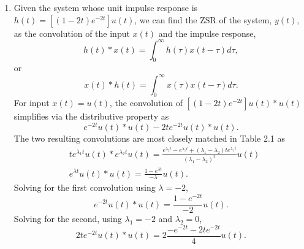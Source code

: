 \documentclass{article}
\begin{document}
\begin{enumerate}[label=\thesubsubsection]
		Using the simplified impulse matching method to confirm the results, 
		\begin{align}
			h(t) = b_0\delta(t) + [P(D)y_n(t)]u(t),
		\end{align}
		assume \(b_0 = 0\), \(P(D) = D+5\) and solve for \(y_n(t)\), assuming \(y_n(0) = 0\) and \(\dot{y}_n(0) = 1\) as 
		\begin{align*}
			&h(t) = (c_1e^{-3t} + c_2e^{-t})u(t) \\
			&\dot{h}(t) = (-3c_1e^{-3t} - c_2e^{-t})u(t) \\ \\
			&h(0) = c_1 + c_2 = 0 \\
			&\dot{h}(0) = -3c_1 - c_2 = 1 \\ \\
			&c_1 = -0.5, \ \ c_2 = 0.5 \\ \\
			&y_n(t) = -0.5e^{-3t} + 0.5e^{-t}.
		\end{align*}
		Solving for \(h(t),\)
		\[
			h(t) = [(D+5)(-0.5e^{-3t} + 0.5e^{-t})]u(t) = [(1.5e^{-3t} - 0.5e^{-t}) + (-2.5e^{-3t} + 2.5e^{-t})]u(t).
		\]
		Simplyfing, 
		\[
			h(t) = (-e^{-3t} + 2e^{-t})u(t),
		\]
which matches the initial solution for \(h(t)\).
\setcounter{subsection}{4}
\setcounter{subsubsection}{18}
\item 
	Given the system whose unit impulse response is \(h(t) = [(1-2t)e^{-2t}]u(t)\), we can find the ZSR of the system, \(y(t)\), as the convolution of the input \(x(t)\) and the impulse response, 
	\[
		h(t) * x(t) = \int_{0}^{\infty}h(\tau)x(t-\tau)d\tau,
	\]
	or 
	\[
	  x(t) * h(t) = \int_{0}^{\infty}x(\tau)x(t-\tau)d\tau.
	\]
		For input \(x(t) = u(t)\), the convolution of \([(1-2t)e^{-2t}]u(t) * u(t)\) simplifies via the distributive property as 
			\[
				e^{-2t}u(t) * u(t) - 2te^{-2t}u(t) * u(t).
			\]
			The two resulting convolutions are most closely matched in Table 2.1 as 
			\begin{align*}
				&te^{\lambda_1 t}u(t) * e^{\lambda_2 t}u(t) = \frac{e^{\lambda_2 t} - e^{\lambda_1 t} + (\lambda_1 - \lambda_2)te^{\lambda_1 t}}{(\lambda_1 - \lambda_2)^2}u(t) \\
				&e^{\lambda t}u(t) * u(t) = \frac{1-e^{\lambda t}}{-\lambda}u(t). 
			\end{align*}
			Solving for the first convolution using \(\lambda = -2\), 
			\[
				e^{-2t}u(t) * u(t) = \frac{1-e^{-2t}}{-2}u(t).
			\]
			Solving for the second, using \(\lambda_1 = -2\) and \(\lambda_2 = 0\), 
			\[
				2te^{-2t}u(t) * u(t) = 2\frac{-e^{-2t} - 2te^{-2t}}{4}u(t).
\]
\end{enumerate}
\end{document}
